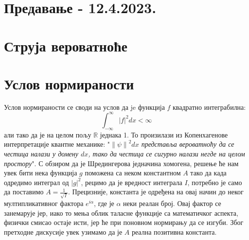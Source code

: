 \documentclass{tufte-handout} %
\theoremstyle{definition}
\theoremstyle{remark}
\newcommand{\R}{\mathbb{R}}
\newcommand{\norm}[1]{\left\lVert #1 \right\rVert}
\begin{document}
\section{Предавање - 12.4.2023.}





\appendix
\section{Струја вероватноће}

\section{Услов нормираности}\label{sec:uslov_normiranosti}
Услов нормираности се своди на услов да je функција $f$ квадратно интеграбилна: \begin{equation*}
	\int_{-\infty}^{\infty}|f|^2dx<\infty
\end{equation*}
али тако да је на целом пољу $\R$ једнака 1. То произилази из Копенхагенове интерпретације квантне механике: "\textit{$\norm{\psi}^2dx$ представља вероватноћу да се честица налази у домену $dx$, тако да честица се сигурно налази негде на целом простору}". 
С обзиром да је Шредингерова једначина хомогена, решење ће нам увек бити нека функција $g$ поможена са неком константном $A$ тако да када одредимо интеграл од $|g|^2$, рецимо да је вредност интеграла $I$, потребно је само да поставимо $A=\frac{1}{\sqrt{I}}$. Прецизније, константа је одређена на овај начин до неког мултипликативног фактора $e^{i\alpha}$, где је $\alpha$ неки реалан број. Овај фактор се занемарује јер, иако то мења облик таласне функције са математичког аспекта, физички смисао остаје исти, јер ће при поновном нормирању да се изгуби. Због претходне дискусије увек узимамо да је $A$ реална позитивна константа.
\end{document}
